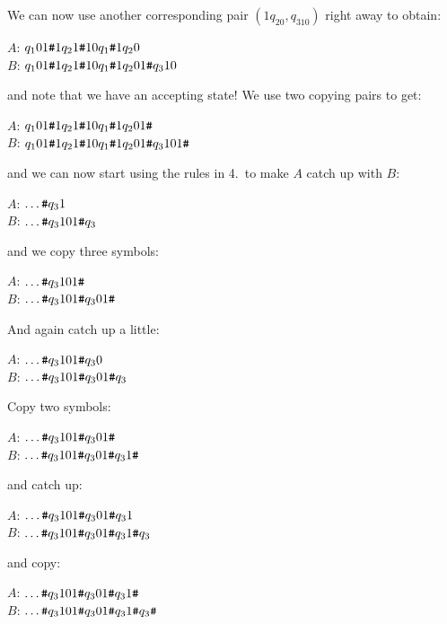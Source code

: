 \begin{frame}

{\footnotesize
We can now use another corresponding pair $(1q_20,q_310)$ right away
to obtain:

$A$: {\hsh}$q_101{\texttt{\#}}1q_21{\texttt{\#}}10q_1{\texttt{\#}}1q_20$ \\
$B$: {\hsh}$q_101{\texttt{\#}}1q_21{\texttt{\#}}10q_1{\texttt{\#}}1q_201{\texttt{\#}}q_310$ 

and note that we have an accepting state!  We use two copying pairs to
get:

$A$: {\hsh}$q_101{\texttt{\#}}1q_21{\texttt{\#}}10q_1{\texttt{\#}}1q_201{\texttt{\#}}$ \\
$B$: {\hsh}$q_101{\texttt{\#}}1q_21{\texttt{\#}}10q_1{\texttt{\#}}1q_201{\texttt{\#}}q_3101{\texttt{\#}}$ 

and we can now start using the rules in 4.\ to make $A$ catch up with
$B$:

$A$: $\ldots{\texttt{\#}}q_31$ \\
$B$: $\ldots{\texttt{\#}}q_3101{\texttt{\#}}q_3$ 

and we copy three symbols:

$A$: $\ldots{\texttt{\#}}q_3101{\texttt{\#}}$ \\
$B$: $\ldots{\texttt{\#}}q_3101{\texttt{\#}}q_301{\texttt{\#}}$ 
}
\end{frame}

\begin{frame}
And again catch up a little:

$A$: $\ldots{\texttt{\#}}q_3101{\texttt{\#}}q_30$ \\
$B$: $\ldots{\texttt{\#}}q_3101{\texttt{\#}}q_301{\texttt{\#}}q_3$ 

Copy two symbols:

$A$: $\ldots{\texttt{\#}}q_3101{\texttt{\#}}q_301{\texttt{\#}}$ \\
$B$: $\ldots{\texttt{\#}}q_3101{\texttt{\#}}q_301{\texttt{\#}}q_31{\texttt{\#}}$ 

and catch up:

$A$: $\ldots{\texttt{\#}}q_3101{\texttt{\#}}q_301{\texttt{\#}}q_31$ \\
$B$: $\ldots{\texttt{\#}}q_3101{\texttt{\#}}q_301{\texttt{\#}}q_31{\texttt{\#}}q_3$ 

and copy:

$A$: $\ldots{\texttt{\#}}q_3101{\texttt{\#}}q_301{\texttt{\#}}q_31{\texttt{\#}}$ \\
$B$: $\ldots{\texttt{\#}}q_3101{\texttt{\#}}q_301{\texttt{\#}}q_31{\texttt{\#}}q_3{\texttt{\#}}$ 
\end{frame}

